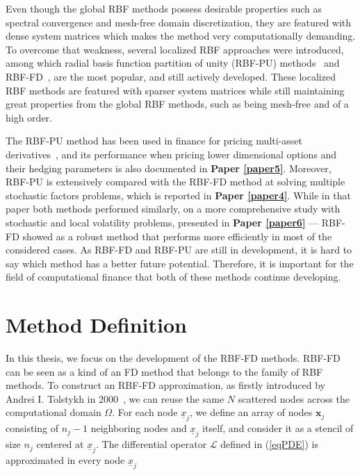 \documentclass{UUThesisTemplate}
\begin{document}
\par
Even though the global RBF methods possess desirable properties such as spectral convergence and mesh-free domain discretization, they are featured with dense system matrices which makes the method very computationally demanding. To overcome that weakness, several localized RBF approaches were introduced, among which radial basis function partition of unity (RBF-PU) methods~\cite{wendland2002fast} and RBF-FD~\cite{tolstykh2000using, wright2006scattered}, are the most popular, and still actively developed. These localized RBF methods are featured with sparser system matrices while still maintaining great properties from the global RBF methods, such as being mesh-free and of a high order.

\par
The RBF-PU method has been used in finance for pricing multi-asset derivatives~\cite{safdari2015radial, shcherbakov2016radialvanilla, shcherbakov2016radial}, and its performance when pricing lower dimensional options and their hedging parameters is also documented in \textbf{Paper \ref{paper5}}. Moreover, RBF-PU is extensively compared with the RBF-FD method at solving multiple stochastic factors problems, which is reported in \textbf{Paper \ref{paper4}}. While in that paper both methods performed similarly, on a more comprehensive study with stochastic and local volatility problems, presented in \textbf{Paper \ref{paper6}} --- RBF-FD showed as a robust method that performs more efficiently in most of the considered cases. As RBF-FD and RBF-PU are still in development, it is hard to say which method has a better future potential. Therefore, it is important for the field of computational finance that both of these methods continue developing.
%





%
\section{Method Definition}

\par
In this thesis, we focus on the development of the RBF-FD methods. RBF-FD can be seen as a kind of an FD method that belongs to the family of RBF methods. To construct an RBF-FD approximation, as firstly introduced by Andrei I. Tolstykh in 2000~\cite{tolstykh2000using}, we can reuse the same $N$ scattered nodes across the computational domain $\Omega$. For each node $\underline{x}_j$, we define an array of nodes $\mathbf{x}_j$ consisting of $n_j-1$ neighboring nodes and $\underline{x}_j$ itself, and consider it as a stencil of size $n_j$ centered at $\underline{x}_j$. The differential operator $\mathcal{L}$ defined in (\ref{eqPDE}) is approximated in every node  $\underline{x}_j$
\end{document}
